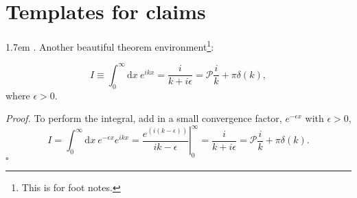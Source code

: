 \documentclass{article}
\def\dd{\mathrm{d}}
\newenvironment{proof}{\emph{Proof.}}{\hfill $\square$\par}
\begin{document}
\section{Templates for claims}
\hangindent 1.7em
. Another beautiful theorem environment\footnote{This is for foot notes.}:
\begin{prop*}[before={\par\parindent=1.2em}, width=\linewidth-1.2em]{1}{}
    \begin{equation*}
        I\equiv\int_0^\infty\dd x~e^{ikx}=\frac{i}{k+i\epsilon}=\mathcal{P}\frac{i}{k}+\pi\delta(k),
    \end{equation*}
    where $\epsilon>0$.
\end{prop*}
\begin{proof}
    To perform the integral, add in a small convergence factor, $e^{-\epsilon x}$ with $\epsilon>0$,
    \begin{equation*}
        I=\int_0^\infty\dd x~e^{-\epsilon x}e^{ikx}=\left.\frac{e^{(i(k-\epsilon))}}{ik-\epsilon}\right|_0^\infty=\frac{i}{k+i\epsilon}=\mathcal{P}\frac{i}{k}+\pi\delta(k).
    \end{equation*}
\end{proof}
\end{document}
